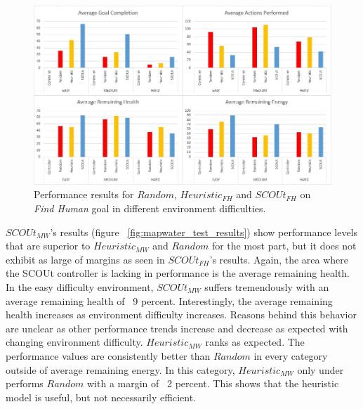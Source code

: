 \begin{figure}[h]
  \includegraphics[width=1.0\columnwidth]{Figures/Results/Experiment1/FindHuman.JPG}
  \caption{Performance results for $Random$, $Heuristic_{FH}$ and $SCOUt_{FH}$ on \textit{Find Human} goal in different environment difficulties.}
  \label{fig:findhuman_test_results}
\end{figure}


$SCOUt_{MW}$'s results (figure ~\ref{fig:mapwater_test_results}) show performance levels that are superior to $Heuristic_{MW}$ and $Random$ for the most part, but it does not exhibit as large of margins as seen in $SCOUt_{FH}$'s results.
Again, the area where the SCOUt controller is lacking in performance is the average remaining health.
In the easy difficulty environment, $SCOUt_{MW}$ suffers tremendously with an average remaining health of ~9 percent.
Interestingly, the average remaining health increases as environment difficulty increases.
Reasons behind this behavior are unclear as other performance trends increase and decrease as expected with changing environment difficulty.
$Heuristic_{MW}$ ranks as expected.
The performance values are consistently better than $Random$ in every category outside of average remaining energy.
In this category, $Heuristic_{MW}$ only under performs $Random$ with a margin of ~2 percent.
This shows that the heuristic model is useful, but not necessarily efficient.

